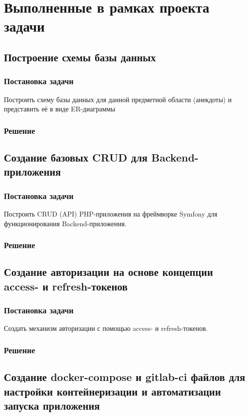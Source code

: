 \documentclass[pract]{SCWorks}
\begin{document}
\section{Выполненные в рамках проекта задачи}
\subsection{Построение схемы базы данных}
\subsubsection{Постановка задачи}
Построить схему базы данных для данной предметной области (анекдоты) и 
представить её в виде ER-диаграммы
\subsubsection{Решение}

\subsection{Создание базовых CRUD для Backend-приложения}
\subsubsection{Постановка задачи}
Построить CRUD (API) PHP-приложения на фреймворке Symfony для функционирования
Backend-приложения. 
\subsubsection{Решение}

\subsection{Создание авторизации на основе концепции access- и refresh-токенов}
\subsubsection{Постановка задачи}
Создать механизм авторизации с помощью access- и refresh-токенов.
\subsubsection{Решение}
\subsection{Создание docker-compose и gitlab-ci файлов для настройки
    контейнеризации и автоматизации запуска приложения}
\end{document}
